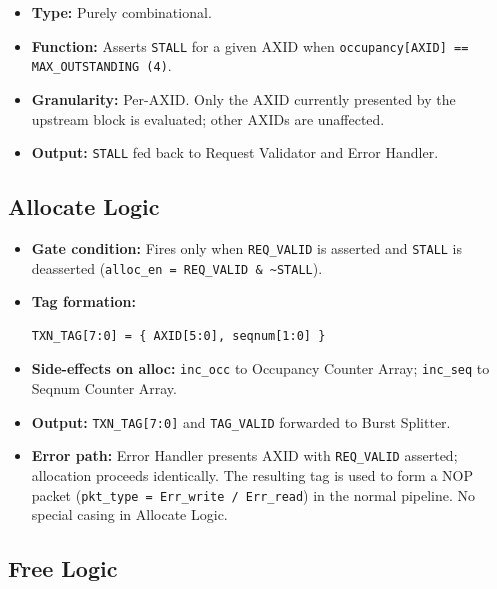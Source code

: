 \documentclass[11pt,a4paper]{article}
\begin{document}
\begin{itemize}
  \item \textbf{Type:} Purely combinational.
  \item \textbf{Function:} Asserts \texttt{STALL} for a given AXID when
        \texttt{occupancy[AXID] == MAX\_OUTSTANDING (4)}.
  \item \textbf{Granularity:} Per-AXID. Only the AXID currently
        presented by the upstream block is evaluated; other AXIDs are
        unaffected.
  \item \textbf{Output:} \texttt{STALL} fed back to Request Validator
        and Error Handler.
\end{itemize}

\subsection{Allocate Logic}

\begin{itemize}
  \item \textbf{Gate condition:} Fires only when \texttt{REQ\_VALID}
        is asserted and \texttt{STALL} is deasserted
        (\texttt{alloc\_en = REQ\_VALID \& \textasciitilde{}STALL}).
  \item \textbf{Tag formation:}
\begin{lstlisting}
TXN_TAG[7:0] = { AXID[5:0], seqnum[1:0] }
\end{lstlisting}
  \item \textbf{Side-effects on alloc:}
        \texttt{inc\_occ} to Occupancy Counter Array;
        \texttt{inc\_seq} to Seqnum Counter Array.
  \item \textbf{Output:} \texttt{TXN\_TAG[7:0]} and \texttt{TAG\_VALID}
        forwarded to Burst Splitter.
  \item \textbf{Error path:} Error Handler presents AXID with
        \texttt{REQ\_VALID} asserted; allocation proceeds identically.
        The resulting tag is used to form a NOP packet
        (\texttt{pkt\_type = Err\_write / Err\_read}) in the normal
        pipeline. No special casing in Allocate Logic.
\end{itemize}

\subsection{Free Logic}
\end{document}
